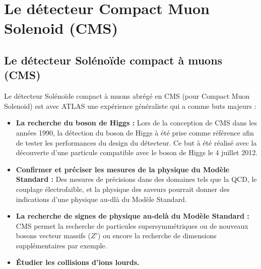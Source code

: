 \chapter{Le détecteur Compact Muon Solenoid (CMS)}
\renewcommand\chapterillustration{CMS/cms.jpeg}
\ThisULCornerWallPaper{1}{\chapterillustration}
\minitoc

\section{Le détecteur Solénoïde compact à muons (CMS)}
Le détecteur Solénoïde compact à muons abrégé en CMS (pour Compact Muon Solenoid) est avec ATLAS une expérience généraliste qui a comme buts majeurs :

\begin{itemize}[label=$\bullet$]
	\item \textbf{La recherche du boson de Higgs : } Lors de la conception de CMS dans les années 1990, la détection du boson de Higgs à été prise comme référence afin de tester les performances du design du détecteur. Ce but à été réalisé avec la découverte d'une particule compatible avec le boson de Higgs le 4 juillet 2012.
	\item \textbf{Confirmer et préciser les mesures de la physique du Modèle Standard : } Des mesures de précisions dans des domaines tels que la QCD, le couplage électrofaible, et la physique des saveurs pourrait donner des indications d'une physique au-dlà du Modèle Standard.
	\item \textbf{La recherche de signes de physique au-delà du Modèle Standard : }CMS permet la recherche de particules supersymmétriques ou de nouveaux bosons vecteur massifs ($Z'$) ou encore la recherche de dimensions supplémentaires par exemple.
	\item \textbf{Étudier les collisions d'ions lourds.}
\end{itemize}

